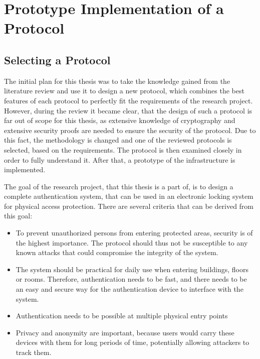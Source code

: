 \newpage
\section{Prototype Implementation of a Protocol}
\label{sec:implementation}

\subsection{Selecting a Protocol}
\label{sec:imp_selection}

The initial plan for this thesis was to take the knowledge gained from the literature review
and use it to design a new protocol, which combines the best features of each
protocol to perfectly fit the requirements of the research project.
However, during the review it became clear, that the design of such a protocol is far
out of scope for this thesis, as extensive knowledge of cryptography and extensive
security proofs are needed to ensure the security of the protocol.
Due to this fact, the methodology is changed and one of the reviewed protocols is selected,
based on the requirements.
The protocol is then examined closely in order to fully understand it.
After that, a prototype of the infrastructure is implemented.

The goal of the research project, that this thesis is a part of, is to design a complete
authentication system, that can be used in an electronic locking system for physical access protection.
There are several criteria that can be derived from this goal:
\begin{itemize}
    \item To prevent unauthorized persons from entering protected areas, security is of the highest importance.
          The protocol should thus not be susceptible to any known attacks that could compromise the integrity of the system.
    \item The system should be practical for daily use when entering buildings, floors or rooms.
          Therefore, authentication needs to be fast, and there needs to be an easy and secure way for
          the authentication device to interface with the system.
    \item Authentication needs to be possible at multiple physical entry points
    \item Privacy and anonymity are important, because users would carry these devices
          with them for long periods of time, potentially allowing attackers to track them.
\end{itemize}

